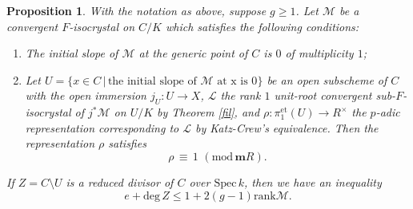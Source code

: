 \documentclass[11pt]{amsart}
\newtheorem{proposition}[Lemma]{Proposition}
\begin{document}
\begin{proposition}\label{est} With the notation as above, suppose $g \geq 1$. 
Let $\mathcal M$ be a convergent $F$-isocrystal on $C/K$ 
which satisfies the following conditions:
\begin{enumerate}
\item[(i)] The initial slope of $\mathcal M$ at the generic point of $C$ is $0$ of multiplicity $1$; 
\item[(ii)] Let $U = \{ x \in C\, |\,  \mbox{the initial slope of $\mathcal M$ at x is 0}\}$ be an open subscheme of $C$ 
with the open immersion $j_U : U \rightarrow X$, 
$\mathcal L$ the rank $1$ unit-root convergent sub-$F$-isocrystal 
of $j^\ast\mathcal M$ on $U/K$ by Theorem \ref{fil}, and 
$\rho : \pi_1^{\mathrm{et}}(U) \rightarrow R^\times$ 
the $p$-adic representation corresponding to $\mathcal L$ by Katz-Crew's equivalence. Then 
the representation $\rho$ satisfies 
$$
    \rho\, \equiv\, 1\, \, (\mathrm{mod}\, {\mathbf m}R). 
$$
\end{enumerate}
If $Z = C \setminus U$ is a reduced divisor of $C$ over $\mathrm{Spec}\, k$, then we have an inequality 
$$
       e + \mathrm{deg}\, Z \leq 1 + 2(g-1)\mathrm{rank}\mathcal M. 
$$
\end{proposition} 
\end{document}
